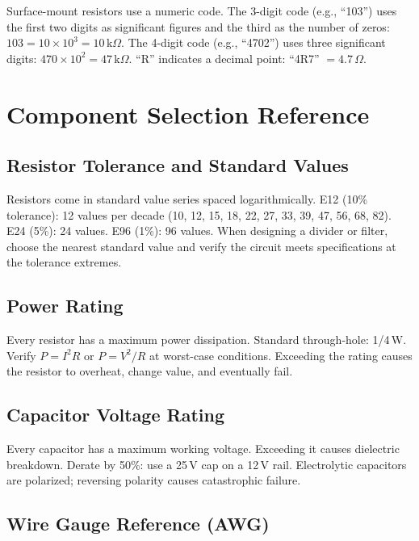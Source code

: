 \begin{tipbox}
Surface-mount resistors use a numeric code. The 3-digit code (e.g., ``103'') uses the first two digits as significant figures and the third as the number of zeros: $103 = 10 \times 10^3 = 10\,\text{k}\Omega$. The 4-digit code (e.g., ``4702'') uses three significant digits: $470 \times 10^2 = 47\,\text{k}\Omega$. ``R'' indicates a decimal point: ``4R7'' $= 4.7\,\Omega$.
\end{tipbox}


\section{Component Selection Reference}

\subsection{Resistor Tolerance and Standard Values}
Resistors come in standard value series spaced logarithmically. E12 (10\% tolerance): 12 values per decade (10, 12, 15, 18, 22, 27, 33, 39, 47, 56, 68, 82). E24 (5\%): 24 values. E96 (1\%): 96 values. When designing a divider or filter, choose the nearest standard value and verify the circuit meets specifications at the tolerance extremes.

\subsection{Power Rating}
Every resistor has a maximum power dissipation. Standard through-hole: 1/4\,W. Verify $P = I^2R$ or $P = V^2/R$ at worst-case conditions. Exceeding the rating causes the resistor to overheat, change value, and eventually fail.

\subsection{Capacitor Voltage Rating}
Every capacitor has a maximum working voltage. Exceeding it causes dielectric breakdown. Derate by 50\%: use a 25\,V cap on a 12\,V rail. Electrolytic capacitors are polarized; reversing polarity causes catastrophic failure.

\subsection{Wire Gauge Reference (AWG)}

